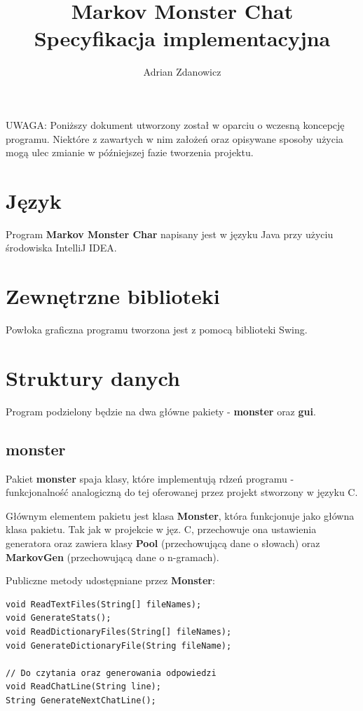 \documentclass{article}
\title{Markov Monster Chat \\
Specyfikacja implementacyjna}
\author{Adrian Zdanowicz}
\begin{document}
\maketitle


UWAGA: Poniższy dokument utworzony został w oparciu o wczesną koncepcję programu.
Niektóre z zawartych w nim założeń oraz opisywane sposoby użycia mogą
ulec zmianie w późniejszej fazie tworzenia projektu.


\section{Język}

Program \textbf{Markov Monster Char} napisany jest w języku Java przy użyciu środowiska IntelliJ IDEA.


\section{Zewnętrzne biblioteki}

Powłoka graficzna programu tworzona jest z pomocą biblioteki Swing.

\section{Struktury danych}

Program podzielony będzie na dwa główne pakiety - \textbf{monster} oraz \textbf{gui}.

\subsection{monster}

Pakiet \textbf{monster} spaja klasy, które implementują rdzeń programu - funkcjonalność
analogiczną do tej oferowanej przez projekt stworzony w języku C.

Głównym elementem pakietu jest klasa \textbf{Monster}, która funkcjonuje jako główna klasa pakietu. Tak jak w projekcie w jęz. C, przechowuje ona ustawienia generatora oraz zawiera klasy \textbf{Pool} (przechowującą dane o słowach) oraz \textbf{MarkovGen} (przechowującą dane o n-gramach).

Publiczne metody udostępniane przez \textbf{Monster}:

\begin{lstlisting}[frame=single]
void ReadTextFiles(String[] fileNames);
void GenerateStats();
void ReadDictionaryFiles(String[] fileNames);
void GenerateDictionaryFile(String fileName);

// Do czytania oraz generowania odpowiedzi
void ReadChatLine(String line);
String GenerateNextChatLine();
\end{lstlisting}
\end{document}
